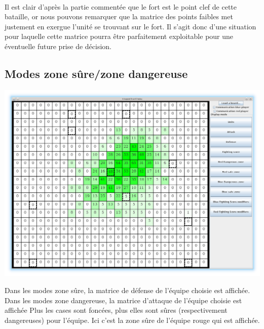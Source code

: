 			\paragraph{}
			Il est clair d'après la partie commentée que le fort est le point clef de cette bataille, or nous pouvons remarquer que la matrice des points faibles
			met justement en exergue l'unité se trouvant sur le fort. Il s'agit donc d'une situation pour laquelle cette matrice pourra être parfaitement exploitable
			pour une éventuelle future prise de décision.	
			
			\clearpage	

		\subsection{Modes zone sûre/zone dangereuse}
			\centerline{\includegraphics[scale=0.5]{images/screen_safe.png}}
			Dans les modes zone sûre, la matrice de défense de l'équipe choisie est affichée.
			Dans les modes zone dangereuse, la matrice d'attaque de l'équipe choisie est affichée
			Plus les cases sont foncées, plus elles sont sûres (respectivement dangereuses) pour l'équipe.
			Ici c'est la zone sûre de l'équipe rouge qui est affichée.

			\clearpage

